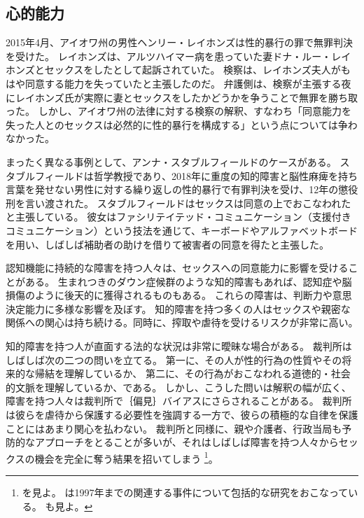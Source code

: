 \documentclass[paper=a4,book,openany]{jlreq}
\begin{document}
\subsection{心的能力}

2015年4月、アイオワ州の男性ヘンリー・レイホンズは性的暴行の罪で無罪判決を受けた。
レイホンズは、アルツハイマー病を患っていた妻ドナ・ルー・レイホンズとセックスをしたとして起訴されていた。
検察は、レイホンズ夫人がもはや同意する能力を失っていたと主張したのだ。
弁護側は、検察が主張する夜にレイホンズ氏が実際に妻とセックスをしたかどうかを争うことで無罪を勝ち取った。
しかし、アイオワ州の法律に対する検察の解釈、すなわち「同意能力を失った人とのセックスは必然的に性的暴行を構成する」という点については争わなかった\citep{belluck15:_sex_demen_husban_trial_age}。

まったく異なる事例として、アンナ・スタブルフィールドのケースがある。
スタブルフィールドは哲学教授であり、2018年に重度の知的障害と脳性麻痺を持ち言葉を発せない男性に対する繰り返しの性的暴行で有罪判決を受け、12年の懲役刑を言い渡された。
スタブルフィールドはセックスは同意の上でおこなわれたと主張している。
彼女はファシリテイテッド・コミュニケーション（支援付きコミュニケーション）という技法を通じて、キーボードやアルファベットボードを用い、しばしば補助者の助けを借りて被害者の同意を得たと主張した\citep{engber15:_stran_case_anna_stubb}。

認知機能に持続的な障害を持つ人々は、セックスへの同意能力に影響を受けることがある。
生まれつきのダウン症候群のような知的障害もあれば、認知症や脳損傷のように後天的に獲得されるものもある。
これらの障害は、判断力や意思決定能力に多様な影響を及ぼす。
知的障害を持つ多くの人はセックスや親密な関係への関心は持ち続ける。同時に、搾取や虐待を受けるリスクが非常に高い\citep{justice16:_crime_person_disab}。

知的障害を持つ人が直面する法的な状況は非常に曖昧な場合がある。
裁判所はしばしば次の二つの問いを立てる。
第一に、その人が性的行為の性質やその将来的な帰結を理解しているか、
第二に、その行為がおこなわれる道徳的・社会的文脈を理解しているか、である。
しかし、こうした問いは解釈の幅が広く、障害を持つ人々は裁判所で｛偏見｝{バイアス}にさらされることがある。
裁判所は彼らを虐待から保護する必要性を強調する一方で、彼らの積極的な自律を保護ことにはあまり関心を払わない。
裁判所と同様に、親や介護者、行政当局も予防的なアプローチをとることが多いが、それはしばしば障害を持つ人々からセックスの機会を完全に奪う結果を招いてしまう\nocite{appel10:_sex_right_disab} \footnote{\citet{appel10:_sex_right_disab}を見よ。
\citet{denno97:_sexual_rape_mental_retar}は1997年までの関連する事件について包括的な研究をおこなっている。
\citet[p.86]{kulick15:_lonel_its_oppos}も見よ。
}。
\end{document}

